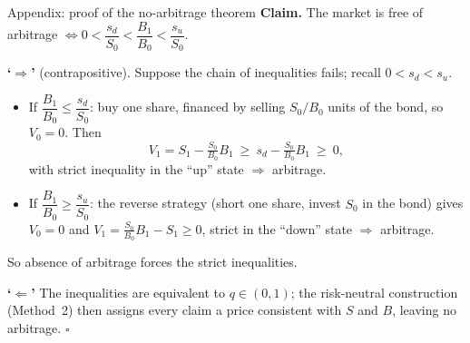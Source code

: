 \documentclass[pdf, handout]{beamer}
\begin{document}
\begin{frame}{Appendix: proof of the no-arbitrage theorem}
\hypertarget{app:noarb}{}
\textbf{Claim.} The market is free of arbitrage $\iff 0<\dfrac{s_d}{S_0}<\dfrac{B_1}{B_0}<\dfrac{s_u}{S_0}$.
\medskip

\textbf{`$\Rightarrow$'} (contrapositive). Suppose the chain of inequalities fails; recall $0<s_d<s_u$.
\begin{itemize}
\item If $\dfrac{B_1}{B_0}\leq \dfrac{s_d}{S_0}$: buy one share, financed by selling $S_0/B_0$ units of the bond, so $V_0=0$. Then
\[
V_1=S_1-\tfrac{S_0}{B_0}B_1\ \geq\ s_d-\tfrac{S_0}{B_0}B_1\ \geq\ 0,
\]
with strict inequality in the ``up'' state $\Rightarrow$ arbitrage.
\item If $\dfrac{B_1}{B_0}\geq \dfrac{s_u}{S_0}$: the reverse strategy (short one share, invest $S_0$ in the bond) gives $V_0=0$ and $V_1=\tfrac{S_0}{B_0}B_1-S_1\geq 0$, strict in the ``down'' state $\Rightarrow$ arbitrage.
\end{itemize}
So absence of arbitrage forces the strict inequalities.
\medskip

\textbf{`$\Leftarrow$'} The inequalities are equivalent to $q\in(0,1)$; the risk-neutral construction (Method~2) then assigns every claim a price consistent with $S$ and $B$, leaving no arbitrage. \hfill$\square$
\end{frame}
\end{document}

